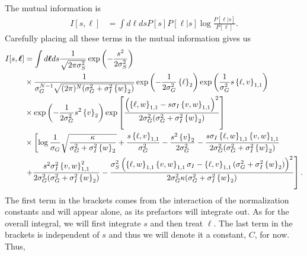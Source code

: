 \documentclass[11pt]{article}
\begin{document}
The mutual information is 
\begin{align}
	I[s,\boldsymbol{\ell}] &= \int d\boldsymbol{\ell} ds P[s] P[\boldsymbol{\ell}|s] \log \frac{P[\boldsymbol{\ell}|s]}{P[\boldsymbol{\ell}]}.
\end{align}
Carefully placing all these terms in the mutual information gives us 
\begin{align}
I[s, \boldsymbol{\ell}] &= \int d\boldsymbol{\ell}ds \frac{1}{\sqrt{2\pi \sigma_S^2}}\exp\left(-\frac{s^2}{2\sigma_S^2}\right) \notag \\ 
& \times \frac{1}{\sigma_G^{N-1}\sqrt{(2\pi)^N(\sigma_G^2 + \sigma_I^2 \left\{w\right\}_2)}}\exp\left(-\frac{1}{2\sigma_G^2}\left\{\ell \right\}_2\right)\exp\left(\frac{1}{\sigma_G^2} s\left\{\ell, v\right\}_{1,1}\right)\notag \\
& \times \exp\left(-\frac{1}{2\sigma_G^2}s^2 \left\{v\right\}_2\right)\exp\left[\frac{\left(\left\{\ell, w\right\}_{1,1} - s \sigma_I \left\{v,w\right\}_{1,1}\right)^2}{2\sigma_G^2 (\sigma_G^2 + \sigma_I^2 \left\{w\right\}_2)}\right] \notag \\
& \times \left[\log \frac{1}{\sigma_G}\sqrt{\frac{\kappa}{\sigma_G^2 +\sigma_I^2 \left\{w\right\}_2}}  + \frac{s \left\{\ell, v\right\}_{1,1}}{\sigma_G^2} - \frac{s^2 \left\{v\right\}_2}{2\sigma_G^2} - \frac{s \sigma_I\left\{\ell, w\right\}_{1,1} \left\{v,w\right\}_{1,1}}{2\sigma_G^2 (\sigma_G^2 + \sigma_I^2 \left\{w\right\}_2)} \right. \notag \\
& \left. +\frac{s^2 \sigma_I^2\left\{v,w\right\}_{1,1}^2}{2\sigma_G^2 (\sigma_G^2 + \sigma_I^2 \left\{w\right\}_2)} -\frac{\sigma_S^2\left(\left\{\ell,w\right\}_{1,1} \left\{v,w\right\}_{1,1} \sigma_I - \left\{\ell, v\right\}_{1,1} (\sigma_G^2 +\sigma_I^2 \left\{w\right\}_2)\right)^2}{2\sigma_G^2 \kappa (\sigma_G^2 + \sigma_I^2 \left\{w\right\}_2)}  \right].
\end{align}
The first term in the brackets comes from the interaction of the normalization constants and will appear alone, as its prefactors will integrate out. As for the overall integral, we will first integrate $s$ and then treat $\boldsymbol{\ell}$. The last term in the brackets is independent of $s$ and thus we will denote it a constant, $C$, for now. Thus,
\end{document}

